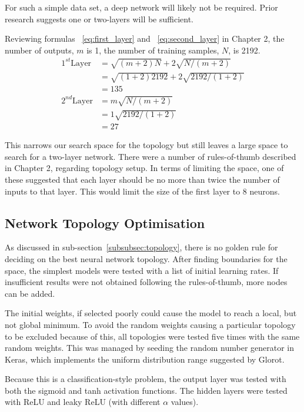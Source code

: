 For such a simple data set, a deep network will likely not be required. Prior research\cite{LeCun_backprop}\cite{Goodfellow_deeplearning}\cite{huang_two_layer} suggests one or two-layers will be sufficient.

Reviewing formulas ~\ref{eq:first_layer} and ~\ref{eq:second_layer} in Chapter 2, the number of outputs, $m$ is 1, the number of training samples, $N$, is 2192.
\begin{align*}
    1^{st} \text{Layer}&= \sqrt{\left(m+2\right)N} + 2\sqrt{N/\left(m+2\right)} \\
    &= \sqrt{\left(1+2\right)2192} + 2\sqrt{2192/\left(1+2\right)} \\
    &= 135 \\
    2^{nd} \text{Layer}&= m\sqrt{N/\left(m+2\right)} \\
    &= 1\sqrt{2192/\left(1+2\right)} \\
    &= 27  
\end{align*}

This narrows our search space for the topology but still leaves a large space to search for a two-layer network. There were a number of rules-of-thumb described in Chapter 2, regarding topology setup. In terms of limiting the space, one of these suggested that each layer should be no more than twice the number of inputs to that layer. This would limit the size of the first layer to 8 neurons.

\subsection{Network Topology Optimisation}

As discussed in sub-section~\ref{subsubsec:topology}, there is no golden rule for deciding on the best neural network topology. After finding boundaries for the space, the simplest models were tested with a list of initial learning rates. If insufficient results were not obtained following the rules-of-thumb, more nodes can be added.

The initial weights, if selected poorly could cause the model to reach a local, but not global minimum. To avoid the random weights causing a particular topology to be excluded because of this, all topologies were tested five times with the same random weights. This was managed by seeding the random number generator in Keras, which implements the uniform distribution range suggested by Glorot\cite{Glorot_difficulties}.

Because this is a classification-style problem, the output layer was tested with both the sigmoid and tanh activation functions. The hidden layers were tested with ReLU and leaky ReLU (with different $\alpha$ values).

